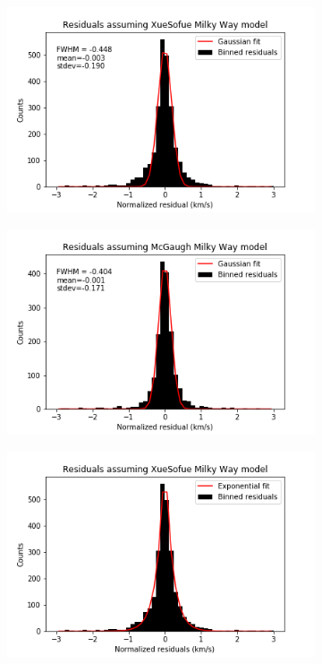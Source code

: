 \documentclass[reprint,%
 amsmath,amssymb,
 aps,
]{revtex4-1}
\begin{document}
\begin{figure}[h]
     \centering
     \begin{subfigure}[b]{0.475\textwidth}
         \centering
         \includegraphics[width=.8\linewidth]{figures/ResidualHist_GaussFit_v1_sinh_v2_cosh.png}
         \label{fig:XueSofue residuals gaussian fit}
     \end{subfigure}
     \begin{subfigure}[b]{0.475\textwidth}
         \centering
         \includegraphics[width=.8\linewidth]{figures/ResidualHist_GaussFit_v1_sinh_v2_cosh_McGaugh.png}
         \label{fig:McGaugh residuals gaussian fit}
     \end{subfigure}
     \begin{subfigure}[b]{0.475\textwidth}
         \centering
         \includegraphics[width=.8\linewidth]{figures/ResidualHist_ExpFit_v1_sinh_v2_cosh.png}

\end{subfigure}
\end{figure}
\end{document}
